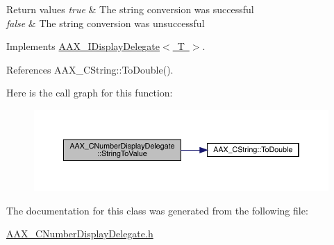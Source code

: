 \begin{DoxyRetVals}{Return values}
{\em true} & The string conversion was successful \\
\hline
{\em false} & The string conversion was unsuccessful \\
\hline
\end{DoxyRetVals}


Implements \mbox{\hyperlink{a01801_aed5224775c9f733f091afddfba057d5e}{A\+A\+X\+\_\+\+I\+Display\+Delegate$<$ T $>$}}.



References A\+A\+X\+\_\+\+C\+String\+::\+To\+Double().

Here is the call graph for this function\+:
\nopagebreak
\begin{figure}[H]
\begin{center}
\leavevmode
\includegraphics[width=350pt]{a01509_ad7fba7856368f7ffe4398e6efd65dfa5_cgraph}
\end{center}
\end{figure}


The documentation for this class was generated from the following file\+:\begin{DoxyCompactItemize}
\item 
\mbox{\hyperlink{a00446}{A\+A\+X\+\_\+\+C\+Number\+Display\+Delegate.\+h}}\end{DoxyCompactItemize}
